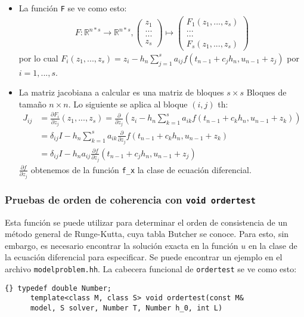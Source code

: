 \begin{itemize}
\item La función \lstinline{F} se ve como esto:
  \begin{align*}
    F: \mathbb{R}^{n*s} \to \mathbb{R}^{n*s}, \left( \begin{array}{c}z_1 \\...\\...\\z_s\end{array} \right) \mapsto \left( \begin{array}{c}F_1(z_1,...,z_s)\\...\\...\\F_s(z_1,...,z_s)\end{array} \right)
  \end{align*}
  por lo cual $F_i(z_1,...,z_s) = z_i-h_n \sum_{j=1}^s
  a_{ij}f(t_{n-1}+c_jh_n, u_{n-1}+z_j)$ por $i = 1,...,s$.

\item La matriz jacobiana a calcular es una matriz de bloques
  $s\times s$ Bloques de tamaño $n \times n$. Lo siguiente se aplica al bloque $ (i, j) $ th:
  \begin{align}
    J_{ij} &= \frac{\partial F_i}{\partial z_j}(z_1,...,z_s) = \frac{\partial}{\partial z_j}(z_i - h_n \sum_{k=1}^s a_{ik}f(t_{n-1}+c_kh_n, u_{n-1}+z_k)) \\
           &= \delta_{ij}I-h_n \sum_{k=1}^s a_{ik} \frac{\partial}{\partial z_j}f(t_{n-1}+c_kh_n, u_{n-1}+z_k)\\
           &= \delta_{ij}I-h_n a_{ij} \frac{\partial f}{\partial z_j}(t_{n-1}+c_jh_n, u_{n-1}+z_j)
  \end{align}
  $ \frac{\partial f}{\partial z_j}$ obtenemos de la función \lstinline{f_x} la clase de ecuación diferencial.
\end{itemize}

\subsubsection{Pruebas de orden de coherencia con \lstinline{void ordertest}}

Esta función se puede utilizar para determinar el orden de consistencia de un método general 
de Runge-Kutta, cuya tabla Butcher se conoce. Para esto, sin embargo, es necesario encontrar 
la solución exacta en la función $u$ en la clase de la ecuación diferencial
para especificar. Se puede encontrar un ejemplo en el archivo
\lstinline{modelproblem.hh}.  La cabecera funcional de
\lstinline{ordertest} se ve como esto:
{\footnotesize{\begin{lstlisting}{} typedef double Number;
      template<class M, class S> void ordertest(const M&
      model, S solver, Number T, Number h_0, int L)
    \end{lstlisting}}}

